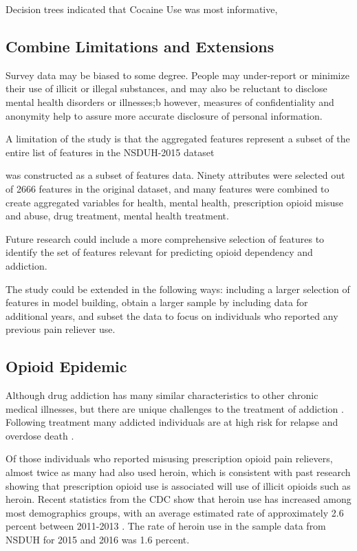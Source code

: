 \documentclass[sigconf]{acmart}
\begin{document}
Decision trees indicated that Cocaine Use was most informative,



\subsection{Combine Limitations and Extensions}

Survey data may be biased to some degree. People may under-report or minimize 
their use of illicit or illegal substances, and may also be reluctant to 
disclose mental health disorders or illnesses;b however, measures of 
confidentiality and anonymity help to assure more accurate disclosure 
of personal information. 

A limitation of the study is that the aggregated features represent a subset
of the entire list of features in the NSDUH-2015 dataset 


was constructed as a subset of 
features data. 
Ninety attributes were selected out of 2666 features in the original dataset, 
and many features were combined to create aggregated variables for health, 
mental health, prescription opioid misuse and abuse, drug treatment, mental health
treatment. 

Future research could include a more comprehensive selection of
features to identify the set of features relevant for predicting opioid
dependency and addiction. 

The study could be extended in the following ways: including a larger
selection of features in model building, obtain a larger sample by including 
data for additional years, and subset the data to focus on individuals who 
reported any previous pain reliever use. 



\subsection{Opioid Epidemic}

Although drug addiction has many similar characteristics 
to other chronic medical illnesses, but there are unique challenges to the 
treatment of addiction \cite{marsch12, swendson16}. 
Following treatment many addicted individuals are at high 
risk for relapse and overdose death \cite{shaham03}.

Of those individuals who reported misusing prescription opioid pain relievers, 
almost twice as many had also used heroin, which is  consistent with past
research showing that prescription opioid use is associated will use of illicit 
opioids such as heroin. Recent statistics from the CDC show that heroin use has 
increased among most demographics groups, with an average estimated rate  of 
approximately 2.6 percent between 2011-2013 \cite{cdc16}. The rate of heroin use
in the sample data from NSDUH for 2015 and 2016 was 1.6 percent. 
\end{document}
